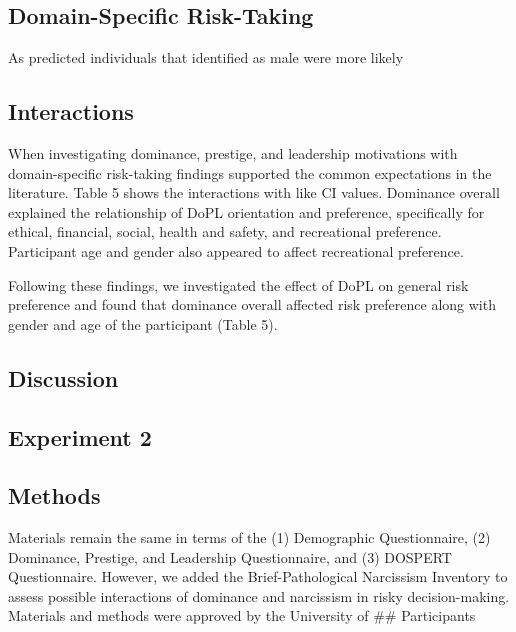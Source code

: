 \documentclass[
  donotrepeattitle,doc, 12pt, a4paper,floatsintext]{apa7}
\begin{document}
\hypertarget{domain-specific-risk-taking}{%
\subsection{Domain-Specific Risk-Taking}\label{domain-specific-risk-taking}}

As predicted individuals that identified as male were more likely

\hypertarget{interactions}{%
\subsection{Interactions}\label{interactions}}

When investigating dominance, prestige, and leadership motivations with domain-specific risk-taking findings supported the common expectations in the literature. Table 5 shows the interactions with like CI values. Dominance overall explained the relationship of DoPL orientation and preference, specifically for ethical, financial, social, health and safety, and recreational preference. Participant age and gender also appeared to affect recreational preference.

Following these findings, we investigated the effect of DoPL on general risk preference and found that dominance overall affected risk preference along with gender and age of the participant (Table 5).

\hypertarget{discussion}{%
\subsection{Discussion}\label{discussion}}

\hypertarget{experiment-2}{%
\subsection{Experiment 2}\label{experiment-2}}

\hypertarget{methods}{%
\subsection{Methods}\label{methods}}

Materials remain the same in terms of the (1) Demographic Questionnaire, (2) Dominance, Prestige, and Leadership Questionnaire, and (3) DOSPERT Questionnaire. However, we added the Brief-Pathological Narcissism Inventory to assess possible interactions of dominance and narcissism in risky decision-making. Materials and methods were approved by the University of
\#\# Participants
\end{document}
